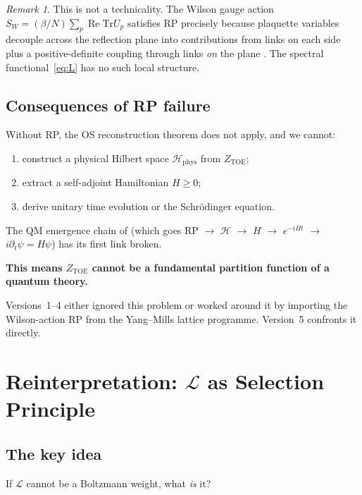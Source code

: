 \documentclass[12pt]{article}
\theoremstyle{definition}
\theoremstyle{remark}
\newtheorem{remark}[theorem]{Remark}
\newcommand{\Tr}{\mathrm{Tr}}
\newcommand{\re}{\operatorname{Re}}
\newcommand{\TOE}{\mathrm{TOE}}
\begin{document}
\begin{remark}
This is not a technicality.  The Wilson gauge action
$S_W = (\beta/N)\sum_p \re\Tr U_p$ satisfies RP precisely because
plaquette variables decouple across the reflection plane into
contributions from links on each side plus a
positive-definite coupling through links \emph{on} the plane
\cite{OS73}.  The spectral functional~\eqref{eq:L} has no such
local structure.
\end{remark}

\subsection{Consequences of RP failure}

Without RP, the OS reconstruction theorem
\cite{OS73,OS75} does not apply, and we cannot:
\begin{enumerate}
\item[(i)] construct a physical Hilbert space $\mathcal{H}_{\mathrm{phys}}$
  from $Z_\TOE$;
\item[(ii)] extract a self-adjoint Hamiltonian $H \geq 0$;
\item[(iii)] derive unitary time evolution or the Schr\"odinger equation.
\end{enumerate}
The QM emergence chain of \cite{OlbrykQM2026} (which goes
RP $\to$ $\mathcal{H}$ $\to$ $H$ $\to$ $e^{-iHt}$ $\to$
$i\partial_t\psi = H\psi$) has its first link broken.

\textbf{This means $Z_\TOE$ cannot be a fundamental partition function
of a quantum theory.}

Versions~1--4 either ignored this problem or worked around it by
importing the Wilson-action RP from the Yang--Mills lattice programme.
Version~5 confronts it directly.

\section{Reinterpretation: $\mathcal{L}$ as Selection Principle}
\label{sec:selection}

\subsection{The key idea}

If $\mathcal{L}$ cannot be a Boltzmann weight, what \emph{is} it?
\end{document}
